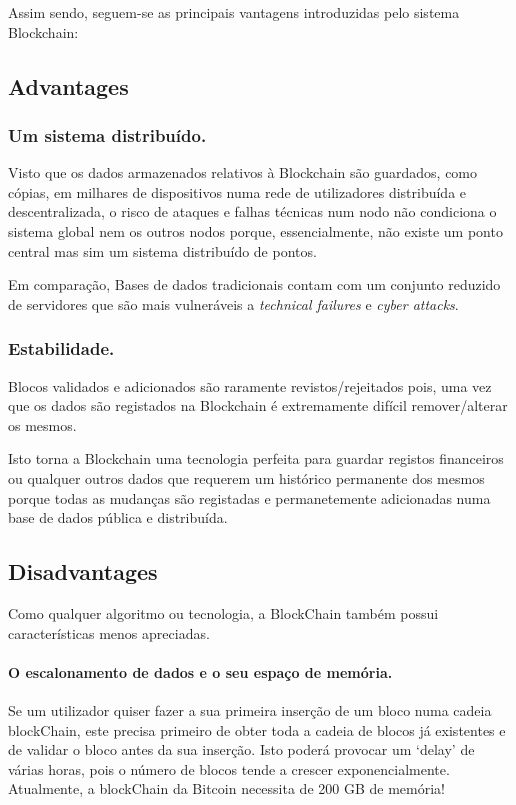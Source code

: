 \documentclass{llncs}
\begin{document}
Assim sendo, seguem-se as principais vantagens introduzidas pelo sistema Blockchain:

\subsection{Advantages}
\vspace{0.05cm}
\subsubsection{Um sistema distribuído.}

	Visto que os dados armazenados relativos à Blockchain são guardados, como cópias, em milhares de dispositivos numa rede de utilizadores distribuída e descentralizada, o risco de ataques e falhas técnicas num nodo não condiciona o sistema global nem os outros nodos porque, essencialmente, não existe um ponto central mas sim um sistema distribuído de pontos.

	Em comparação, Bases de dados tradicionais contam com um conjunto reduzido de servidores que são mais vulneráveis a \textit{technical failures} e \textit{cyber attacks}.

\subsubsection{Estabilidade.}

	Blocos validados e adicionados são raramente revistos/rejeitados pois, uma vez que os dados são registados na Blockchain é extremamente difícil remover/alterar os mesmos.

	Isto torna a Blockchain uma tecnologia perfeita para guardar registos financeiros ou qualquer outros dados que requerem um histórico permanente dos mesmos porque todas as mudanças são registadas e permanetemente adicionadas numa base de dados pública e distribuída.

\subsection{Disadvantages}

Como qualquer algoritmo ou tecnologia, a BlockChain também possui características menos apreciadas. 
\paragraph{\textbf{O escalonamento de dados e o seu espaço de memória.}} Se um utilizador quiser fazer a sua primeira inserção de um bloco numa cadeia blockChain, este precisa primeiro de obter toda a cadeia de blocos já existentes e de validar o bloco antes da sua inserção. Isto poderá provocar um ‘delay’ de várias horas, pois o número de blocos tende a crescer exponencialmente. Atualmente, a blockChain da Bitcoin necessita de 200 GB de memória!
 
\end{document}
